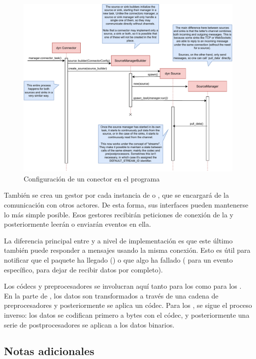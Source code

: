 \begin{figure}
    \centering
    \includegraphics[width=\textwidth]{./Imagenes/setting-up.pdf}
    \caption{Configuración de un conector en el programa}%
    \label{fig:tremor_setting_up}
\end{figure}

También se crea un gestor por cada instancia de \sink o \source, que se
encargará de la comunicación con otros actores. De esta forma, sus interfaces
pueden mantenerse lo más simple posible. Esos gestores recibirán peticiones de
conexión de la \pipeline y posteriormente leerán o enviarán eventos en ella.

La diferencia principal entre \sources y \sinks a nivel de implementación es que
este último también puede responder a mensajes usando la misma conexión. Esto es
útil para notificar que el paquete ha llegado () o que algo ha fallado
( para un evento específico,  para dejar de
recibir datos por completo).

Los códecs y preprocesadores se involucran aquí tanto para los \sources como
para los \sinks. En la parte de \source, los datos son transformados a través de
una cadena de preprocesadores y posteriormente se aplica un códec. Para los
\sinks, se sigue el proceso inverso: los datos se codifican primero a bytes con
el códec, y posteriormente una serie de postprocesadores se aplican a los datos
binarios.

\subsection{Notas adicionales}

